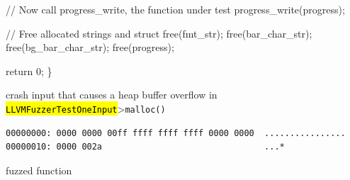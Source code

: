 \documentclass[
  a4paper,
]{scrreprt}
\newenvironment{Shaded}{\begin{snugshade}}{\end{snugshade}}
\newcommand{\CommentTok}[1]{\textcolor[rgb]{0.41,0.41,0.41}{#1}}
\newcommand{\ControlFlowTok}[1]{\textcolor[rgb]{0.85,0.12,0.09}{#1}}
\newcommand{\DecValTok}[1]{\textcolor[rgb]{0.47,0.16,0.63}{#1}}
\newcommand{\NormalTok}[1]{\textcolor[rgb]{0.33,0.33,0.33}{#1}}
\newcommand{\OperatorTok}[1]{\textcolor[rgb]{0.00,0.46,0.62}{#1}}
\theoremstyle{definition}
\theoremstyle{remark}
\begin{document}
\begin{Shaded}
\begin{Highlighting}[numbers=left,,]
    \CommentTok{// Now call progress\_write, the function under test}
\NormalTok{    progress\_write}\OperatorTok{(}\NormalTok{progress}\OperatorTok{);}

    \CommentTok{// Free allocated strings and struct}
\NormalTok{    free}\OperatorTok{(}\NormalTok{fmt\_str}\OperatorTok{);}
\NormalTok{    free}\OperatorTok{(}\NormalTok{bar\_char\_str}\OperatorTok{);}
\NormalTok{    free}\OperatorTok{(}\NormalTok{bg\_bar\_char\_str}\OperatorTok{);}
\NormalTok{    free}\OperatorTok{(}\NormalTok{progress}\OperatorTok{);}

    \ControlFlowTok{return} \DecValTok{0}\OperatorTok{;}
\OperatorTok{\}}
\end{Highlighting}
\end{Shaded}

crash input that causes a heap buffer overflow in
\hl{\mbox{\texttt{LLVMFuzzerTestOneInput}}}\textgreater{}\texttt{malloc()}

\begin{verbatim}
00000000: 0000 0000 00ff ffff ffff ffff 0000 0000  ................
00000010: 0000 002a                                ...*
\end{verbatim}

fuzzed function
\end{document}
